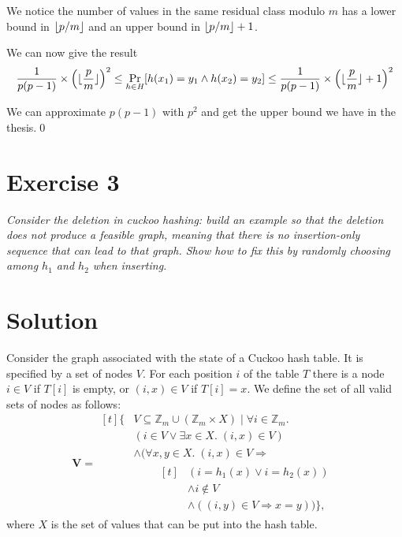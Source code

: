 \documentclass[a4paper, 12pt]{article}
\DeclarePairedDelimiter\floor{\lfloor}{\rfloor}
\begin{document}
We notice the number of values in the same residual class modulo \(m\) has a lower bound in \(\floor{p/m}\)
and an upper bound in \(\floor{p/m} + 1\).

We can now give the result
\[
	\dfrac{1}{p(p-1)} \times \left(\floor{\dfrac{p}{m}}\right)^2 \leq \Pr_{h \in \mathit{H}}[h(x_1) = y_1 \wedge h(x_2) = y_2] \leq \dfrac{1}{p(p-1)} \times \left(\floor{\dfrac{p}{m}} + 1\right)^2
\]

We can approximate \(p(p-1)\) with \(p^2\) and get the upper bound we have in the thesis.\qed

\section{Exercise 3}
{
\itshape{Consider the deletion in cuckoo hashing: build an example so that the deletion does not produce a feasible graph, meaning that there is no insertion-only sequence that can lead to that graph. Show how to fix this by randomly choosing among \(h_1\) and \(h_2\) when inserting.}
}
\section*{Solution}

Consider the graph associated with the state of a Cuckoo hash table. It is specified by a set of nodes \(V\). For each position \(i\) of the table \(T\) there is a node \(i \in V\) if \(T[i]\) is empty, or \((i, x) \in V\) if \(T[i] = x\). We define the set of all valid sets of nodes as follows:
\[ \mathbf{V} =
  \begin{aligned}[t]
    \{ &V \subseteq \mathbb Z_{m} \cup (\mathbb Z_{m} \times X) \mid \forall i \in \mathbb Z_{m}.\\
       &(i \in V \vee \exists x \in X.\; (i, x) \in V) \\
       &\wedge (\forall x,y \in X.\; (i, x) \in V \Rightarrow \\
         &\qquad\begin{aligned}[t]
           &(i = h_1(x) \vee i = h_2(x)) \\
           &\wedge i \notin V \\
           &\wedge ((i, y) \in V \Rightarrow x = y)) \},
         \end{aligned}
  \end{aligned}  \]
where \(X\) is the set of values that can be put into the hash table.
\end{document}
